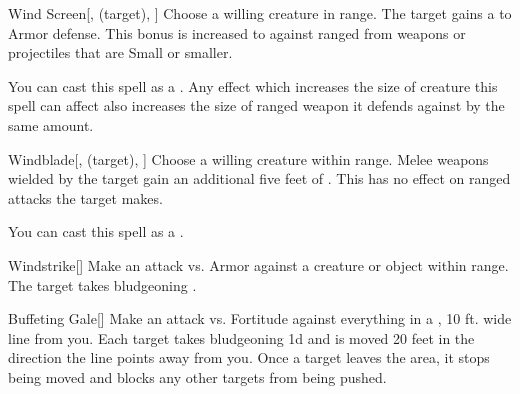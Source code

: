 \lowercase{\hypertarget{spell:Wind Screen}{}}\label{spell:Wind Screen}
\begin{attuneability}[\nth{1}]{\hypertarget{spell:Wind Screen}{Wind Screen}}[,  (target), ]
Choose a willing creature in \rngclose range.
The target gains a   to Armor defense.
This bonus is increased to  against ranged  from weapons or projectiles that are Small or smaller.

You can cast this spell as a .
Any effect which increases the size of creature this spell can affect also increases the size of ranged weapon it defends against by the same amount.
\end{attuneability}
\vspace{0.25em}



\lowercase{\hypertarget{spell:Windblade}{}}\label{spell:Windblade}
\begin{attuneability}[\nth{1}]{\hypertarget{spell:Windblade}{Windblade}}[,  (target), ]
Choose a willing creature within \rngclose range.
Melee weapons wielded by the target gain an additional five feet of .
This has no effect on ranged attacks the target makes.

You can cast this spell as a .
\end{attuneability}
\vspace{0.25em}



\lowercase{\hypertarget{spell:Windstrike}{}}\label{spell:Windstrike}
\begin{freeability}[\nth{1}]{\hypertarget{spell:Windstrike}{Windstrike}}[]
Make an attack vs. Armor against a creature or object within \rnglong range.
\hit The target takes bludgeoning .
\end{freeability}
\vspace{0.25em}



\lowercase{\hypertarget{spell:Buffeting Gale}{}}\label{spell:Buffeting Gale}
\begin{freeability}[\nth{2}]{\hypertarget{spell:Buffeting Gale}{Buffeting Gale}}[]
Make an attack vs. Fortitude against everything in a \arealarge, 10 ft. wide line from you.
\hit Each target takes bludgeoning  \minus1d and is moved 20 feet in the direction the line points away from you.
Once a target leaves the area, it stops being moved and blocks any other targets from being pushed.
\end{freeability}
\vspace{0.25em}



